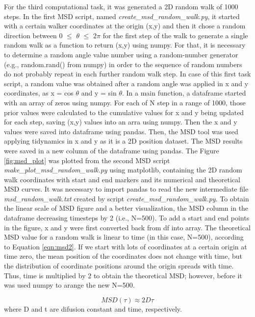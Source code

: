 \documentclass{article}
\begin{document}
For the third computational task, it was generated a 2D random walk of 1000 steps. In the first MSD script, named {\it create\_msd\_random\_walk.py}, it started with a certain walker coordinates at the origin (x,y) and then it chose a random direction between 0 $\leq$ $\theta$ $\leq$ $2\pi$ for the first step of the walk to generate a single random walk as a function to return (x,y) using numpy. For that, it is necessary to determine a random angle value number using a random-number generator (e.g., random.rand() from numpy) in order to the sequence of random numbers do not probably repeat in each further random walk step. In case of this first task script, a random value was obtained after a random angle was applied in x and y coordinates, as x = cos $\theta$ and y = sin $\theta$. In a main function, a dataframe started with an array of zeros using numpy. For each of N step in a range of 1000, those prior values were calculated to the cumulative values for x and y being updated for each step, saving (x,y) values into an arra using numpy. Then the x and y values were saved into dataframe using pandas. Then, the MSD tool was used applying tidynamics in x and y as it is a 2D position dataset. The MSD results were saved in a new column of the dataframe using pandas. The Figure \ref{fig:msd_plot} was plotted from the second MSD script {\it make\_plot\_msd\_random\_walk.py} using matplotlib, containing the 2D random walk coordinates with start and end markers and its numerical and theoretical MSD curves. It was necessary to import pandas to read the new intermediate file {\it msd\_random\_walk.txt} created by script {\it create\_msd\_random\_walk.py}. To obtain the linear scale of MSD figure and a better visualization, the MSD column in the dataframe decreasing timesteps by 2 (i.e., N=500). To add a start and end points in the figure, x and y were first converted back from df into array. The theoretical MSD value for a random walk is linear to time (in this case, N=500), according to Equation \ref{eqn:msd2}. If we start with lots of coordinates at a certain origin at time zero, the mean position of the coordinates does not change with time, but the distribution of coordinate positions around the origin spreads with time. Thus, time is multiplied by 2 to obtain the theoretical MSD; however, before it was used numpy to arange the new N=500.

\begin{equation}
MSD(\tau) \approx 2 D \tau
\label{eqn:msd2}
\end{equation}
where D and t are difusion constant and time, respectively.
\end{document}

